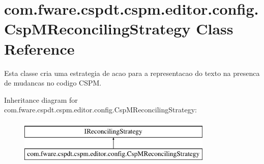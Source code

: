 \hypertarget{classcom_1_1fware_1_1cspdt_1_1cspm_1_1editor_1_1config_1_1_csp_m_reconciling_strategy}{}\section{com.\+fware.\+cspdt.\+cspm.\+editor.\+config.\+Csp\+M\+Reconciling\+Strategy Class Reference}
\label{classcom_1_1fware_1_1cspdt_1_1cspm_1_1editor_1_1config_1_1_csp_m_reconciling_strategy}


Esta classe cria uma estrategia de acao para a representacao do texto na presenca de mudancas no codigo C\+S\+PM.  


Inheritance diagram for com.\+fware.\+cspdt.\+cspm.\+editor.\+config.\+Csp\+M\+Reconciling\+Strategy\+:\begin{figure}[H]
\begin{center}
\leavevmode
\includegraphics[height=2.000000cm]{classcom_1_1fware_1_1cspdt_1_1cspm_1_1editor_1_1config_1_1_csp_m_reconciling_strategy}
\end{center}
\end{figure}
